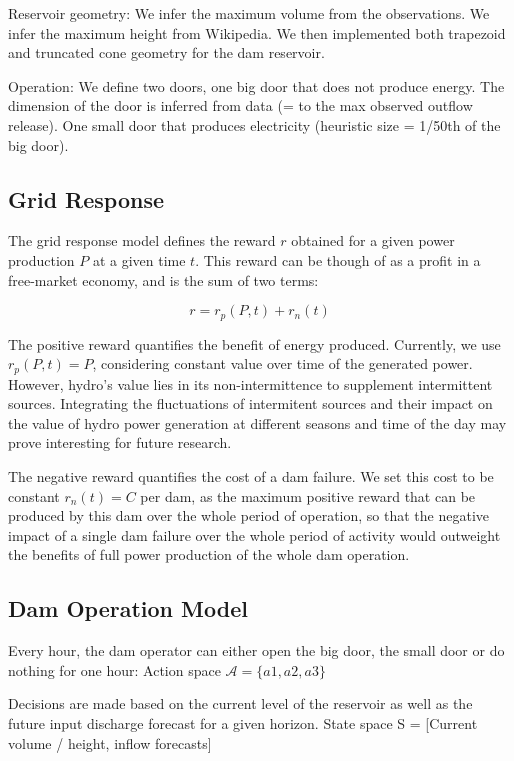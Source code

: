 \documentclass{article}
\begin{document}
Reservoir geometry: We infer the maximum volume from the observations.
We infer the maximum height from Wikipedia. We then implemented both trapezoid and truncated cone geometry for the dam reservoir.

Operation: We define two doors, one big door that does not produce energy.
The dimension of the door is inferred from data (= to the max observed outflow release).
One small door that produces electricity (heuristic size = 1/50th of the big door).


\subsection{Grid Response}
\label{Grid Response}

The grid response model defines the reward $r$ obtained for a given power production $P$ at a given time $t$.
This reward can be though of as a profit in a free-market economy, and is the sum of two terms:

$$ r = r_p(P, t) + r_n(t)$$

The positive reward quantifies the benefit of energy produced.
Currently, we use $r_p(P, t)=P$, considering constant value over time of the generated power.
However, hydro's value lies in its non-intermittence to supplement intermittent sources.
Integrating the fluctuations of intermitent sources and their impact on the value of hydro power generation
at different seasons and time of the day may prove interesting for future research.

The negative reward quantifies the cost of a dam failure.
We set this cost to be constant $r_n(t)=C$ per dam,
as the maximum positive reward that can be produced by this dam over the whole period of operation,
so that the negative impact of a single dam failure over the whole period of activity
would outweight the benefits of full power production of the whole dam operation.

\subsection{Dam Operation Model}
\label{sec: Dam Operation Model}

Every hour, the dam operator can either open the big door, the small door or do nothing for one hour:
Action space $ \mathcal{A} = \{a1, a2, a3 \}$

Decisions are made based on the current level of the reservoir as well as the future input discharge forecast for a given horizon.
State space S = [Current volume / height, inflow forecasts]
\end{document}
